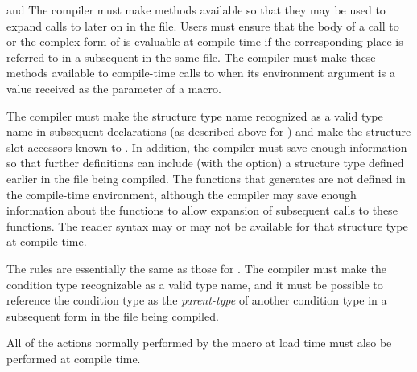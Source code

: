 \begin{flushdesc}
\item[\cdf{defsetf} and \cdf{define-setf-method}]
The compiler must make  methods
    available so that they may be used to expand calls to  later on in
    the file.  Users must ensure that the body of a call
    to  or
    the complex form of  is evaluable at compile time if the
    corresponding place is referred to in a subsequent  in the same
    file.  The compiler must make these  methods available to 
    compile-time calls to  when its environment argument is
    a value received as the  parameter of a macro.
     
\item[\cdf{defstruct}]
The compiler must make the structure type name recognized
    as a valid type name in subsequent declarations (as described above
    for ) and
    make the structure slot accessors known to .
    In addition, the
    compiler must save enough information so that
    further  definitions can include (with the 
    option) a structure type defined
    earlier in the file being compiled.  The functions that 
    generates are not defined in the compile-time environment, although
    the compiler may save enough information about the functions to allow
     expansion of
    subsequent calls to these functions.  The  reader syntax may or may not be 
    available for that structure type at compile time.

\item[\cdf{define-condition}]
The rules are essentially the same as those for
    . The compiler must make the condition type recognizable as a
    valid type name, and it must be possible to reference the condition
    type as the \emph{parent-type} of another condition type in a subsequent
     form in the file being compiled.

\item[\cdf{defpackage}]
 All of the actions normally performed by the  macro at load
    time must also be performed at compile time.
\end{flushdesc}

